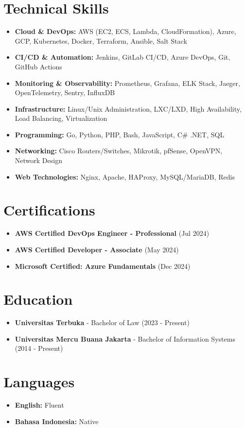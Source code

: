 \documentclass[11pt,a4paper]{article}
\newcommand{\skill}[1]{\textbf{#1}}
\begin{document}
\section{Technical Skills}
\begin{itemize}[leftmargin=*, itemsep=4pt]
    \item \skill{Cloud \& DevOps:} AWS (EC2, ECS, Lambda, CloudFormation), Azure, GCP, Kubernetes, Docker, Terraform, Ansible, Salt Stack
    \item \skill{CI/CD \& Automation:} Jenkins, GitLab CI/CD, Azure DevOps, Git, GitHub Actions
    \item \skill{Monitoring \& Observability:} Prometheus, Grafana, ELK Stack, Jaeger, OpenTelemetry, Sentry, InfluxDB
    \item \skill{Infrastructure:} Linux/Unix Administration, LXC/LXD, High Availability, Load Balancing, Virtualization
    \item \skill{Programming:} Go, Python, PHP, Bash, JavaScript, C\# .NET, SQL
    \item \skill{Networking:} Cisco Routers/Switches, Mikrotik, pfSense, OpenVPN, Network Design
    \item \skill{Web Technologies:} Nginx, Apache, HAProxy, MySQL/MariaDB, Redis
\end{itemize}

\section{Certifications}
\begin{itemize}[leftmargin=*, itemsep=2pt]
    \item \textbf{AWS Certified DevOps Engineer - Professional} (Jul 2024)
    \item \textbf{AWS Certified Developer - Associate} (May 2024)
    \item \textbf{Microsoft Certified: Azure Fundamentals} (Dec 2024)
\end{itemize}

\section{Education}
\begin{itemize}[leftmargin=*, itemsep=2pt]
    \item \textbf{Universitas Terbuka} - Bachelor of Law (2023 - Present)
    \item \textbf{Universitas Mercu Buana Jakarta} - Bachelor of Information Systems (2014 - Present)
\end{itemize}

\section{Languages}
\begin{itemize}[leftmargin=*, itemsep=2pt]
    \item \textbf{English:} Fluent
    \item \textbf{Bahasa Indonesia:} Native
\end{itemize}
\end{document}
